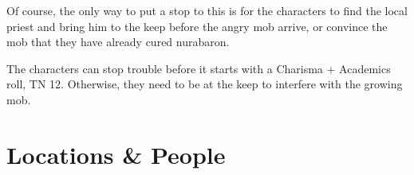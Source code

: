 \begin{multicols}{2}
\begin{boxtext}
\begin{verse}
	\end{verse}

\end{boxtext}

Of course, the only way to put a stop to this is for the characters to find the local priest and bring him to the keep before the angry mob arrive, or convince the mob that they have already cured \gls{nurabaron}.

The characters can stop trouble before it starts with a Charisma + Academics roll, TN 12.
Otherwise, they need to be at the keep to interfere with the growing mob.

%
%
%
%
%

\end{multicols}

\section{Locations \& People}

\label{redfall_map}

\subsection{}

